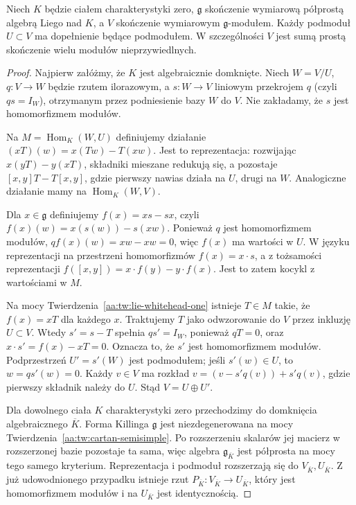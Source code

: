 \begin{twierdzenie}
\label{aa:tw:lie-weyl-complete-reducibility}
Niech $K$ będzie ciałem charakterystyki zero, $\mathfrak g$ skończenie wymiarową półprostą algebrą Liego nad $K$, a $V$ skończenie wymiarowym $\mathfrak g$-modułem. Każdy podmoduł $U\subset V$ ma dopełnienie będące podmodułem. W szczególności $V$ jest sumą prostą skończenie wielu modułów nieprzywiedlnych.
\end{twierdzenie}
\begin{proof}
Najpierw załóżmy, że $K$ jest algebraicznie domknięte. Niech $W=V/U$, $q:V\to W$ będzie rzutem ilorazowym, a $s:W\to V$ liniowym przekrojem $q$ (czyli $qs=I_W$), otrzymanym przez podniesienie bazy $W$ do $V$. Nie zakładamy, że $s$ jest homomorfizmem modułów.

Na $M=\operatorname{Hom}_K(W,U)$ definiujemy działanie $(xT)(w)=x(Tw)-T(xw)$. Jest to reprezentacja: rozwijając $x(yT)-y(xT)$, składniki mieszane redukują się, a pozostaje $[x,y]T-T[x,y]$, gdzie pierwszy nawias działa na $U$, drugi na $W$. Analogiczne działanie mamy na $\operatorname{Hom}_K(W,V)$.

Dla $x\in\mathfrak g$ definiujemy $f(x)=xs-sx$, czyli $f(x)(w)=x(s(w))-s(xw)$. Ponieważ $q$ jest homomorfizmem modułów, $qf(x)(w)=xw-xw=0$, więc $f(x)$ ma wartości w $U$. W języku reprezentacji na przestrzeni homomorfizmów $f(x)=x\cdot s$, a z tożsamości reprezentacji $f([x,y])=x\cdot f(y)-y\cdot f(x)$. Jest to zatem kocykl z wartościami w $M$.

Na mocy Twierdzenia~\ref{aa:tw:lie-whitehead-one} istnieje $T\in M$ takie, że $f(x)=xT$ dla każdego $x$. Traktujemy $T$ jako odwzorowanie do $V$ przez inkluzję $U\subset V$. Wtedy $s'=s-T$ spełnia $qs'=I_W$, ponieważ $qT=0$, oraz $x\cdot s'=f(x)-xT=0$. Oznacza to, że $s'$ jest homomorfizmem modułów. Podprzestrzeń $U'=s'(W)$ jest podmodułem; jeśli $s'(w)\in U$, to $w=qs'(w)=0$. Każdy $v\in V$ ma rozkład $v=(v-s'q(v))+s'q(v)$, gdzie pierwszy składnik należy do $U$. Stąd $V=U\oplus U'$.

Dla dowolnego ciała $K$ charakterystyki zero przechodzimy do domknięcia algebraicznego $\overline K$. Forma Killinga $\mathfrak g$ jest niezdegenerowana na mocy Twierdzenia~\ref{aa:tw:cartan-semisimple}. Po rozszerzeniu skalarów jej macierz w rozszerzonej bazie pozostaje ta sama, więc algebra $\mathfrak g_{\overline K}$ jest półprosta na mocy tego samego kryterium. Reprezentacja i podmoduł rozszerzają się do $V_{\overline K},U_{\overline K}$. Z już udowodnionego przypadku istnieje rzut $P_{\overline K}:V_{\overline K}\to U_{\overline K}$, który jest homomorfizmem modułów i na $U_{\overline K}$ jest identycznością.


\end{proof}
